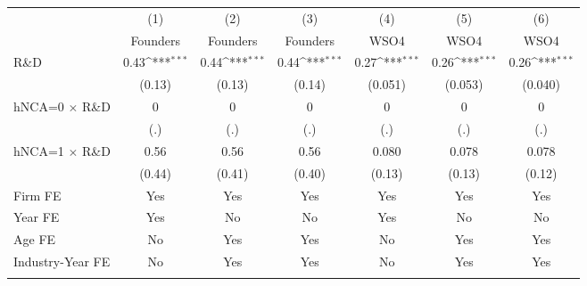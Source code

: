 {
\def\sym#1{\ifmmode^{#1}\else\(^{#1}\)\fi}
\begin{tabular}{l*{6}{c}}
\toprule
                    &\multicolumn{1}{c}{(1)}&\multicolumn{1}{c}{(2)}&\multicolumn{1}{c}{(3)}&\multicolumn{1}{c}{(4)}&\multicolumn{1}{c}{(5)}&\multicolumn{1}{c}{(6)}\\
                    &\multicolumn{1}{c}{Founders}&\multicolumn{1}{c}{Founders}&\multicolumn{1}{c}{Founders}&\multicolumn{1}{c}{WSO4}&\multicolumn{1}{c}{WSO4}&\multicolumn{1}{c}{WSO4}\\
\midrule
R\&D                &        0.43\sym{***}&        0.44\sym{***}&        0.44\sym{***}&        0.27\sym{***}&        0.26\sym{***}&        0.26\sym{***}\\
                    &      (0.13)         &      (0.13)         &      (0.14)         &     (0.051)         &     (0.053)         &     (0.040)         \\
\addlinespace
hNCA=0 $\times$ R\&D&           0         &           0         &           0         &           0         &           0         &           0         \\
                    &         (.)         &         (.)         &         (.)         &         (.)         &         (.)         &         (.)         \\
\addlinespace
hNCA=1 $\times$ R\&D&        0.56         &        0.56         &        0.56         &       0.080         &       0.078         &       0.078         \\
                    &      (0.44)         &      (0.41)         &      (0.40)         &      (0.13)         &      (0.13)         &      (0.12)         \\
\addlinespace
Firm FE             &         Yes         &         Yes         &         Yes         &         Yes         &         Yes         &         Yes         \\
\addlinespace
Year FE             &         Yes         &          No         &          No         &         Yes         &          No         &          No         \\
\addlinespace
Age FE              &          No         &         Yes         &         Yes         &          No         &         Yes         &         Yes         \\
\addlinespace
Industry-Year FE    &          No         &         Yes         &         Yes         &          No         &         Yes         &         Yes         \\
\addlinespace

\end{tabular}}
